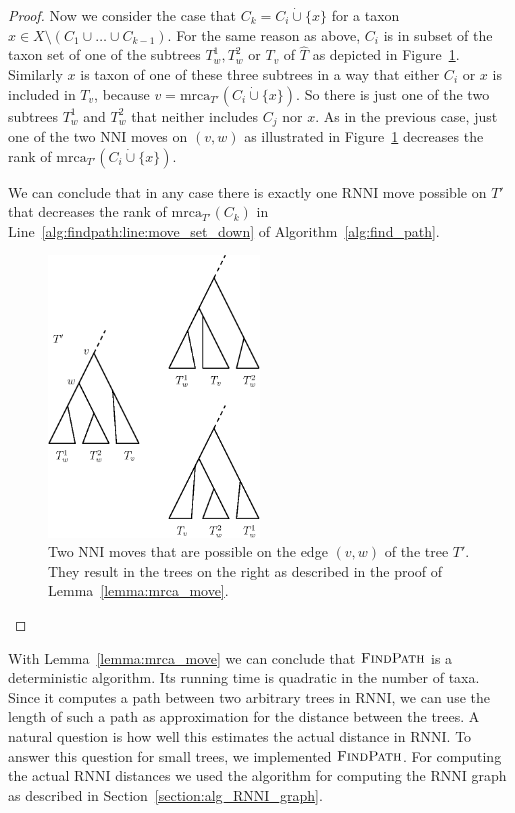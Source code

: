 \documentclass{amsart}
\newcommand{\mrca}{\mathrm{mrca}}
\newcommand{\nni}{\mathrm{NNI}}
\newcommand{\rnni}{\mathrm{RNNI}}
\newcommand{\findpath}{\textsc{FindPath}}
\begin{document}
\begin{proof}
Now we consider the case that $C_k = C_i \dot\cup \{x\}$ for a taxon $x \in X \setminus (C_1 \cup \ldots \cup C_{k-1})$.
For the same reason as above, $C_i$ is in subset of the taxon set of one of the subtrees $T_w^1, T_w^2$ or $T_v$ of $\hat T$ as depicted in Figure~\ref{fig:mrca_move}.
Similarly $x$ is taxon of one of these three subtrees in a way that either $C_i$ or $x$ is included in $T_v$, because $v = \mrca_{T'}(C_i \dot \cup \{x\})$.
So there is just one of the two subtrees $T_w^1$ and $T_w^2$ that neither includes $C_j$ nor $x$.
As in the previous case, just one of the two $\nni$ moves on $(v,w)$ as illustrated in Figure~\ref{fig:mrca_move} decreases the rank of $\mrca_{T'}(C_i \dot \cup \{x\})$.

We can conclude that in any case there is exactly one $\rnni$ move possible on $T'$ that decreases the rank of $\mrca_{T'}(C_k)$ in Line~\ref{alg:findpath:line:move_set_down} of Algorithm~\ref{alg:find_path}.

\begin{figure}[H]
\centering
\includegraphics[width=0.5\textwidth]{mrca_move}
\vspace{12pt}
\caption{Two $\nni$ moves that are possible on the edge $(v,w)$ of the tree $T'$.
They result in the trees on the right as described in the proof of Lemma~\ref{lemma:mrca_move}.}
\label{fig:mrca_move}
\end{figure}

\end{proof}

With Lemma~\ref{lemma:mrca_move} we can conclude that $\findpath$ is a deterministic algorithm.
Its running time is quadratic in the number of taxa.
Since it computes a path between two arbitrary trees in $\rnni$, we can use the length of such a path as approximation for the distance between the trees.
A natural question is how well this estimates the actual distance in $\rnni$.
To answer this question for small trees, we implemented $\findpath$.
For computing the actual $\rnni$ distances we used the algorithm for computing the $\rnni$ graph as described in Section~\ref{section:alg_RNNI_graph}.
\end{document}
